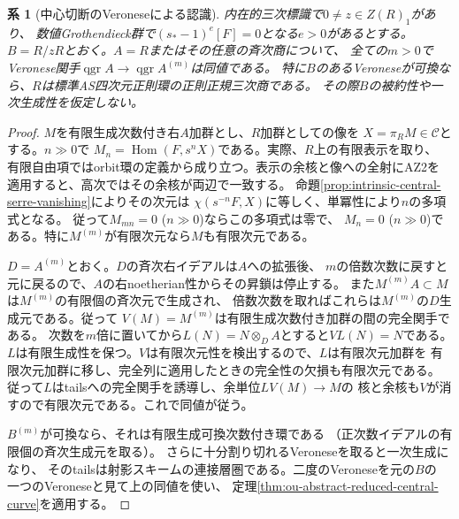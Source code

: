 \documentclass[11pt,a4paper]{ltjsarticle}
\newtheorem{corollary}[theorem]{系}
\theoremstyle{definition}
\newcommand{\qgr}{\operatorname{qgr}}
\begin{document}
\begin{corollary}[中心切断のVeroneseによる認識]
\label{cor:ou-central-veronese-recognition}
内在的三次標識で$0\ne z\in Z(R)_1$があり、
数値Grothendieck群で$(s_*-1)^e[F]=0$となる$e>0$があるとする。
$B=R/zR$とおく。$A=R$またはその任意の斉次商について、
全ての$m>0$でVeronese関手$\qgr A\to\qgr A^{(m)}$は同値である。
特に$B$のあるVeroneseが可換なら、$R$は標準AS四次元正則環の正則正規三次商である。
その際$B$の被約性や一次生成性を仮定しない。
\end{corollary}
\begin{proof}
$M$を有限生成次数付き右$A$加群とし、$R$加群としての像を
$X=\pi_R M\in\mathcal C$とする。$n\gg0$で
$M_n=\operatorname{Hom}(F,s^n X)$である。実際、$R$上の有限表示を取り、
有限自由項ではorbit環の定義から成り立つ。表示の余核と像への全射にAZ2を
適用すると、高次ではその余核が両辺で一致する。
命題\ref{prop:intrinsic-central-serre-vanishing}によりその次元は
$\chi(s^{-n}F,X)$に等しく、単冪性により$n$の多項式となる。
従って$M_{mn}=0$ ($n\gg0$)ならこの多項式は零で、
$M_n=0$ ($n\gg0$)である。特に$M^{(m)}$が有限次元なら$M$も有限次元である。

$D=A^{(m)}$とおく。$D$の斉次右イデアルは$A$への拡張後、
$m$の倍数次数に戻すと元に戻るので、$A$の右noetherian性からその昇鎖は停止する。
また$M^{(m)}A\subset M$は$M^{(m)}$の有限個の斉次元で生成され、
倍数次数を取ればこれらは$M^{(m)}$の$D$生成元である。従って
$V(M)=M^{(m)}$は有限生成次数付き加群の間の完全関手である。
次数を$m$倍に置いてから$L(N)=N\otimes_D A$とすると$VL(N)=N$である。
$L$は有限生成性を保つ。$V$は有限次元性を検出するので、$L$は有限次元加群を
有限次元加群に移し、完全列に適用したときの完全性の欠損も有限次元である。
従って$L$はtailsへの完全関手を誘導し、余単位$LV(M)\to M$の
核と余核も$V$が消すので有限次元である。これで同値が従う。

$B^{(m)}$が可換なら、それは有限生成可換次数付き環である
（正次数イデアルの有限個の斉次生成元を取る）。
さらに十分割り切れるVeroneseを取ると一次生成になり、
そのtailsは射影スキームの連接層圏である。二度のVeroneseを元の$B$の
一つのVeroneseと見て上の同値を使い、
定理\ref{thm:ou-abstract-reduced-central-curve}を適用する。
\end{proof}
\end{document}
